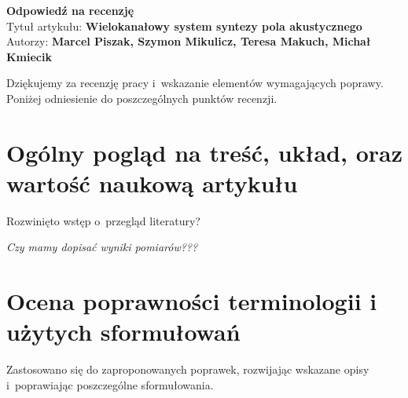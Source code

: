 \documentclass[12pt]{article}
\begin{document}
    \begin{center}
        \textbf{Odpowiedź na recenzję }\\
        \vspace{10pt}
        Tytuł artykułu: \textbf{Wielokanałowy system syntezy pola akustycznego}
        \\
        Autorzy: \textbf{Marcel Piszak, Szymon Mikulicz, Teresa Makuch, Michał
        Kmiecik}
    \end{center}

Dziękujemy za recenzję pracy i~wskazanie elementów wymagających poprawy.
Poniżej odniesienie do poszczególnych punktów recenzji.

\section{Ogólny pogląd na treść, układ, oraz wartość
naukową artykułu}

Rozwinięto wstęp o~przegląd literatury?

\textit{Czy mamy dopisać wyniki pomiarów???}

\section{Ocena poprawności terminologii i użytych sformułowań}

Zastosowano się do zaproponowanych poprawek, rozwijając wskazane opisy
i~poprawiając poszczególne sformułowania.
\end{document}
